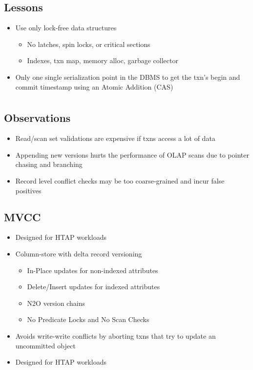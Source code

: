 \documentclass[11pt]{article}
\begin{document}
    \subsection*{Lessons}
    \begin{itemize}
        \item Use only lock-free data structures
        \begin{itemize}
            \item No latches, spin locks, or critical sections
            \item Indexes, txn map, memory alloc, garbage collector
        \end{itemize}
        \item Only one single serialization point in the DBMS to get the txn's begin and commit timestamp using an Atomic Addition (CAS)
    \end{itemize}

\section{}
    \subsection*{Observations}
    \begin{itemize}
        \item Read/scan set validations are expensive if txns access a lot of data
        \item Appending new versions hurts the performance of OLAP scans due to pointer chasing and branching
        \item Record level conflict checks may be too coarse-grained and incur false positives
    \end{itemize}
    \subsection*{ MVCC~\cite{p677-neumann}}
    \begin{itemize}
        \item Designed for HTAP workloads
        \item Column-store with delta record versioning
        \begin{itemize}
            \item In-Place updates for non-indexed attributes
            \item Delete/Insert updates for indexed attributes
            \item N2O version chains
            \item No Predicate Locks and No Scan Checks
        \end{itemize}
        \item Avoids write-write conflicts by aborting txns that try to update an uncommitted object
        \item Designed for HTAP workloads
    \end{itemize}
\end{document}

